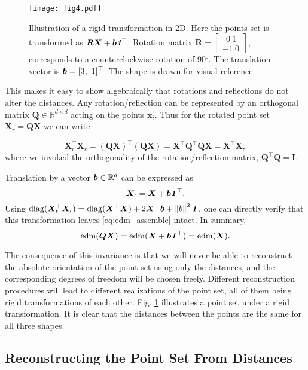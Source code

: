 \documentclass[10pt,double]{IEEEtran}
\providecommand{\R}{\ensuremath{\mathbb{R}}}
\providecommand{\norm}[1]{\left\lVert#1\right\rVert}
\providecommand{\diag}{\mathop{\mathrm{diag}}}
\renewcommand{\vec}[1]{\ensuremath{\boldsymbol{#1}}}
\providecommand{\mat}[1]{\ensuremath{\boldsymbol{#1}}}
\providecommand{\mI}{\mat{I}} \providecommand{\mJ}{\mat{J}}
\providecommand{\mQ}{\mat{Q}} \providecommand{\mR}{\mat{R}}
\providecommand{\mX}{\mat{X}}\providecommand{\mY}{\mat{Y}}
\providecommand{\vx}{\vec{x}} \providecommand{\vy}{\vec{y}}
\DeclareRobustCommand{\mtx}{\texorpdfstring{$\mR = \left[\substack{\ \ 0 \ 1 \\ -1 \ 0}\right]$}{0 \ 1; -1 0}}
\newcommand{\EDM}{\ensuremath{\mathrm{edm}}}
\newcommand{\vone}{\ensuremath{\vec{\mathit{1}}}}
\newcommand{\T}{\ensuremath{\top}}
\renewcommand{\diag}{\mathop{\mathrm{diag}}}
\newcommand{\rev}[1]{{#1}}
\begin{document}
\begin{figure}[t]
\centering
\texttt{[image: fig4.pdf]}
\caption{Illustration of a rigid transformation in 2D. Here the points set is
transformed as $\mR \mX + \vb \vone^{\! \T}$. Rotation matrix \mtx,
corresponds to a counterclockwise rotation of 90$^\circ$. The translation
vector is $\vb = [3, \ 1]^\T$. The shape is drawn for visual reference.}
\label{fig:procrustes}
\end{figure}


This makes it easy to show algebraically that rotations and
reflections do not alter the distances. Any rotation/reflection can be
represented by an orthogonal matrix $\mQ \in \R^{d \times d}$ acting on the
points $\vx_i$. Thus for the rotated point set $\mX_r =
\mQ \mX$ we can write

\begin{equation}
	\mX_r^\T \mX_r = (\mQ \mX)^\T (\mQ \mX) = \mX^\T \mQ^\T \mQ \mX = \mX^\T \mX,
\end{equation}
where we invoked the orthogonality of the rotation/reflection matrix,
$\mQ^\T \mQ = \mI$.

Translation by a vector $\vb \in \R^d$ can be expressed as
\begin{equation}
	\mX_t = \mX + \vb \vone^\T.
\end{equation}
Using $\diag(\mX_t^\T \mX_t) = \diag(\mX^\T \mX) + 2 \mX^\T \vb + \norm{b}^2
\vone$, one can directly verify that this transformation leaves
\eqref{eq:edm_assemble} intact. In summary,
\begin{equation}
	\EDM(\mQ \mX) = \EDM(\mX + \vb \vone^\T) = \EDM(\mX).
\end{equation}

The consequence of this invariance is that we will never be able to
reconstruct the absolute orientation of the point set using only the
distances, and the corresponding degrees of freedom will be chosen freely.
\rev{Different reconstruction procedures will lead to different realizations of the
point set, all of them being rigid transformations of each other.} Fig.
\ref{fig:procrustes} illustrates a point set under a rigid transformation. It
is clear that the distances between the points are the same for all three
shapes.



\subsection{Reconstructing the Point Set From Distances} \label{sub:reconstructing_the_point_set_from_distances}
\end{document}
